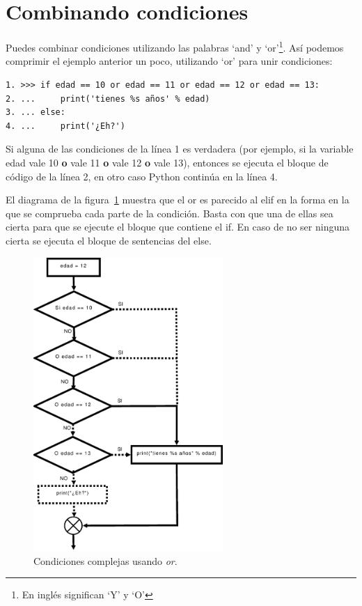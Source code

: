 \section{Combinando condiciones}
Puedes combinar condiciones utilizando las palabras `and' y `or'\footnote{En inglés significan `Y' y `O'}. Así podemos comprimir el ejemplo anterior un poco, utilizando `or' para unir condiciones:

\begin{listing}
\begin{verbatim}
1. >>> if edad == 10 or edad == 11 or edad == 12 or edad == 13:
2. ...     print('tienes %s años' % edad)
3. ... else:
4. ...     print('¿Eh?')
\end{verbatim}
\end{listing}

Si alguna de las condiciones de la línea 1 es verdadera (por ejemplo, si la variable edad vale 10 \textbf{o} vale 11 \textbf{o} vale 12 \textbf{o} vale 13), entonces se ejecuta el bloque de código de la línea 2, en otro caso Python continúa en la línea 4.  

El diagrama de la figura~\ref{if8} muestra que el or es parecido al elif en la forma en la que se comprueba cada parte de la condición. Basta con que una de ellas sea cierta para que se ejecute el bloque que contiene el if. En caso de no ser ninguna cierta se ejecuta el bloque de sentencias del else.

\begin{figure}
\begin{center}
\includegraphics[width=72mm]{if8.eps}
\end{center}
\caption{Condiciones complejas usando \emph{or}.}\label{if8}
\end{figure}

